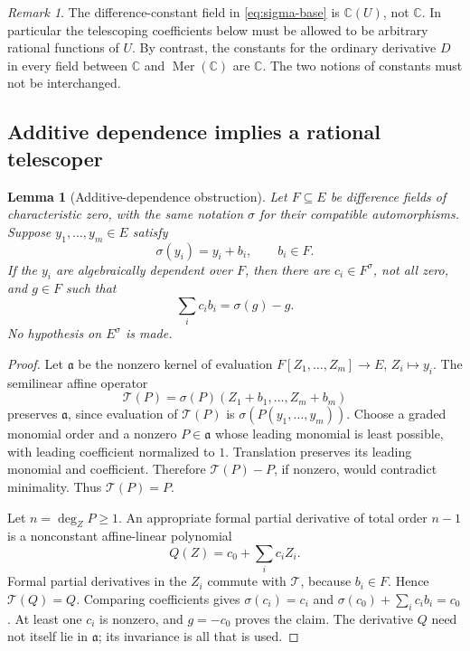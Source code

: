 \documentclass[11pt]{article}
\numberwithin{equation}{section}
\newtheorem{lemma}[lemma]{Lemma}
\theoremstyle{definition}
\theoremstyle{remark}
\newtheorem{remark}[remark]{Remark}
\newcommand{\C}{\mathbb C}
\newcommand{\Mer}{\operatorname{Mer}}
\begin{document}
\begin{remark}
The difference-constant field in \eqref{eq:sigma-base} is $\C(U)$, not $\C$.
In particular the telescoping coefficients below must be allowed to be
arbitrary rational functions of $U$. By contrast, the constants for the
ordinary derivative $D$ in every field between $\C$ and $\Mer(\C)$ are
$\C$. The two notions of constants must not be interchanged.
\end{remark}

\subsection{Additive dependence implies a rational telescoper}

\begin{lemma}[Additive-dependence obstruction]\label{lem:additive-dependence}
Let $F\subseteq E$ be difference fields of characteristic zero, with the
same notation $\sigma$ for their compatible automorphisms. Suppose
$y_1,\ldots,y_m\in E$ satisfy
\[
 \sigma(y_i)=y_i+b_i,\qquad b_i\in F.
\]
If the $y_i$ are algebraically dependent over $F$, then there are
$c_i\in F^\sigma$, not all zero, and $g\in F$ such that
\begin{equation}\label{eq:additive-telescoper}
 \sum_i c_i b_i=\sigma(g)-g.
\end{equation}
No hypothesis on $E^\sigma$ is made.
\end{lemma}
\begin{proof}
Let $\mathfrak a$ be the nonzero kernel of evaluation
$F[Z_1,\ldots,Z_m]\to E$, $Z_i\mapsto y_i$.
The semilinear affine operator
\[
 \mathcal T(P)=\sigma(P)(Z_1+b_1,\ldots,Z_m+b_m)
\]
preserves $\mathfrak a$, since evaluation of $\mathcal T(P)$ is
$\sigma(P(y_1,\ldots,y_m))$.
Choose a graded monomial order and a nonzero $P\in\mathfrak a$ whose leading
monomial is least possible, with leading coefficient normalized to $1$.
Translation preserves its leading monomial and coefficient. Therefore
$\mathcal T(P)-P$, if nonzero, would contradict minimality. Thus
$\mathcal T(P)=P$.

Let $n=\deg_ZP\geq1$. An appropriate formal partial derivative of total order
$n-1$ is a nonconstant affine-linear polynomial
\[
 Q(Z)=c_0+\sum_i c_iZ_i.
\]
Formal partial derivatives in the $Z_i$ commute with $\mathcal T$, because
$b_i\in F$. Hence $\mathcal T(Q)=Q$. Comparing coefficients gives
$\sigma(c_i)=c_i$ and
$\sigma(c_0)+\sum_i c_i b_i=c_0$.
At least one $c_i$ is nonzero, and $g=-c_0$ proves the claim.
The derivative $Q$ need not itself lie in $\mathfrak a$; its invariance is
all that is used.
\end{proof}
\end{document}
